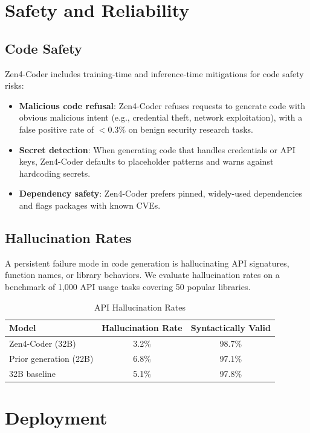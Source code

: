 \documentclass[11pt,a4paper]{article}
\begin{document}
\section{Safety and Reliability}

\subsection{Code Safety}

Zen4-Coder includes training-time and inference-time mitigations for code safety risks:

\begin{itemize}
  \item \textbf{Malicious code refusal}: Zen4-Coder refuses requests to generate code with obvious malicious intent (e.g., credential theft, network exploitation), with a false positive rate of $<0.3\%$ on benign security research tasks.
  \item \textbf{Secret detection}: When generating code that handles credentials or API keys, Zen4-Coder defaults to placeholder patterns and warns against hardcoding secrets.
  \item \textbf{Dependency safety}: Zen4-Coder prefers pinned, widely-used dependencies and flags packages with known CVEs.
\end{itemize}

\subsection{Hallucination Rates}

A persistent failure mode in code generation is hallucinating API signatures, function names, or library behaviors. We evaluate hallucination rates on a benchmark of 1,000 API usage tasks covering 50 popular libraries.

\begin{table}[H]
\centering
\caption{API Hallucination Rates}
\begin{tabular}{lcc}
\toprule
\textbf{Model} & \textbf{Hallucination Rate} & \textbf{Syntactically Valid} \\
\midrule
Zen4-Coder (32B) & 3.2\% & 98.7\% \\
Prior generation (22B) & 6.8\% & 97.1\% \\
32B baseline & 5.1\% & 97.8\% \\
\bottomrule
\end{tabular}
\end{table}

\section{Deployment}
\end{document}

